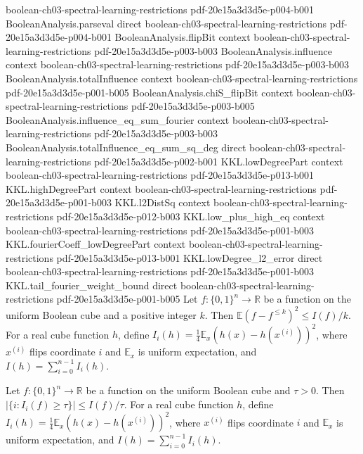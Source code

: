 \begin{lemma}
  {boolean-ch03-spectral-learning-restrictions}
  {pdf-20e15a3d3d5e-p004-b001}
\proofstep
  {BooleanAnalysis.parseval}
  {direct}
  {boolean-ch03-spectral-learning-restrictions}
  {pdf-20e15a3d3d5e-p004-b001}
\proofstep
  {BooleanAnalysis.flipBit}
  {context}
  {boolean-ch03-spectral-learning-restrictions}
  {pdf-20e15a3d3d5e-p003-b003}
\proofstep
  {BooleanAnalysis.influence}
  {context}
  {boolean-ch03-spectral-learning-restrictions}
  {pdf-20e15a3d3d5e-p003-b003}
\proofstep
  {BooleanAnalysis.totalInfluence}
  {context}
  {boolean-ch03-spectral-learning-restrictions}
  {pdf-20e15a3d3d5e-p001-b005}
\proofstep
  {BooleanAnalysis.chiS_flipBit}
  {context}
  {boolean-ch03-spectral-learning-restrictions}
  {pdf-20e15a3d3d5e-p003-b005}
\proofstep
  {BooleanAnalysis.influence_eq_sum_fourier}
  {context}
  {boolean-ch03-spectral-learning-restrictions}
  {pdf-20e15a3d3d5e-p003-b003}
\proofstep
  {BooleanAnalysis.totalInfluence_eq_sum_sq_deg}
  {direct}
  {boolean-ch03-spectral-learning-restrictions}
  {pdf-20e15a3d3d5e-p002-b001}
\proofstep
  {KKL.lowDegreePart}
  {context}
  {boolean-ch03-spectral-learning-restrictions}
  {pdf-20e15a3d3d5e-p013-b001}
\proofstep
  {KKL.highDegreePart}
  {context}
  {boolean-ch03-spectral-learning-restrictions}
  {pdf-20e15a3d3d5e-p001-b003}
\proofstep
  {KKL.l2DistSq}
  {context}
  {boolean-ch03-spectral-learning-restrictions}
  {pdf-20e15a3d3d5e-p012-b003}
\proofstep
  {KKL.low_plus_high_eq}
  {context}
  {boolean-ch03-spectral-learning-restrictions}
  {pdf-20e15a3d3d5e-p001-b003}
\proofstep
  {KKL.fourierCoeff_lowDegreePart}
  {context}
  {boolean-ch03-spectral-learning-restrictions}
  {pdf-20e15a3d3d5e-p013-b001}
\proofstep
  {KKL.lowDegree_l2_error}
  {direct}
  {boolean-ch03-spectral-learning-restrictions}
  {pdf-20e15a3d3d5e-p001-b003}
\proofstep
  {KKL.tail_fourier_weight_bound}
  {direct}
  {boolean-ch03-spectral-learning-restrictions}
  {pdf-20e15a3d3d5e-p001-b005}
Let $f:\{0,1\}^n\to\mathbb R$ be a function on the uniform Boolean cube and a positive
integer $k$. Then $\mathbb E(f-f^{\le k})^2\le I(f)/k$. For a real cube function $h$,
define $I_i(h)=\tfrac14\mathbb E_x(h(x)-h(x^{(i)}))^2$, where $x^{(i)}$ flips coordinate
$i$ and $\mathbb E_x$ is uniform expectation, and $I(h)=\sum_{i=0}^{n-1}I_i(h)$.
\end{lemma}

\begin{lemma}
\leanok
{}
\label{KKL.influential_coords_card}
Let $f:\{0,1\}^n\to\mathbb R$ be a function on the uniform Boolean cube and $\tau>0$.
Then $|\{i:I_i(f)\ge\tau\}|\le I(f)/\tau$. For a real cube function $h$, define
$I_i(h)=\tfrac14\mathbb E_x(h(x)-h(x^{(i)}))^2$, where $x^{(i)}$ flips coordinate $i$
and $\mathbb E_x$ is uniform expectation, and $I(h)=\sum_{i=0}^{n-1}I_i(h)$.
\end{lemma}

